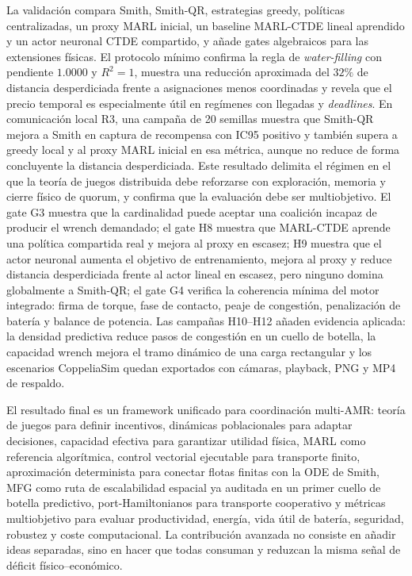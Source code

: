 \documentclass[12pt,a4paper]{article}
\begin{document}
\begin{viuabstract}
La validación compara Smith, Smith-QR, estrategias greedy, políticas centralizadas, un
proxy MARL inicial, un baseline MARL-CTDE lineal aprendido y un actor neuronal CTDE compartido, y añade gates algebraicos para las extensiones físicas. El protocolo mínimo confirma la regla de \emph{water-filling} con pendiente
$1.0000$ y $R^2=1$, muestra una reducción aproximada del $32\%$ de distancia desperdiciada
frente a asignaciones menos coordinadas y revela que el precio temporal es especialmente
útil en regímenes con llegadas y \emph{deadlines}. En comunicación local R3, una campaña
de 20 semillas muestra que Smith-QR mejora a Smith en captura de recompensa con IC95
positivo y también supera a greedy local y al proxy MARL inicial en esa métrica, aunque no reduce de
forma concluyente la distancia desperdiciada. Este resultado delimita el régimen en el
que la teoría de juegos distribuida debe reforzarse con exploración, memoria y cierre
físico de quorum, y confirma que la evaluación debe ser multiobjetivo. El gate G3 muestra
que la cardinalidad puede aceptar una coalición incapaz de producir el wrench demandado;
el gate H8 muestra que MARL-CTDE aprende una política compartida real y mejora al proxy en
escasez; H9 muestra que el actor neuronal aumenta el objetivo de entrenamiento, mejora al
proxy y reduce distancia desperdiciada frente al actor lineal en escasez, pero ninguno
domina globalmente a Smith-QR; el gate G4 verifica la coherencia mínima del motor integrado: firma de torque, fase de
contacto, peaje de congestión, penalización de batería y balance de potencia. Las
campañas H10--H12 añaden evidencia aplicada: la densidad predictiva reduce pasos de
congestión en un cuello de botella, la capacidad wrench mejora el tramo dinámico de una
carga rectangular y los escenarios CoppeliaSim quedan exportados con cámaras, playback,
PNG y MP4 de respaldo.

El resultado final es un framework unificado para coordinación multi-AMR: teoría de
juegos para definir incentivos, dinámicas poblacionales para adaptar decisiones,
capacidad efectiva para garantizar utilidad física, MARL como referencia algorítmica,
control vectorial ejecutable para transporte finito, aproximación determinista para
conectar flotas finitas con la ODE de Smith, MFG como ruta de escalabilidad espacial ya
auditada en un primer cuello de botella predictivo, port-Hamiltonianos para transporte cooperativo y métricas
multiobjetivo para evaluar productividad, energía, vida útil de batería, seguridad,
robustez y coste computacional. La contribución avanzada no consiste en añadir ideas
separadas, sino en hacer que todas consuman y reduzcan la misma señal de déficit
físico--económico.


\end{viuabstract}
\end{document}
